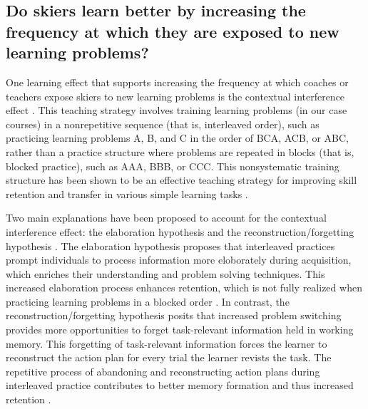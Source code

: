 \subsection{Do skiers learn better by increasing the frequency at which they are exposed to new learning problems?}
One learning effect that supports increasing the frequency at which coaches or teachers expose skiers to new learning problems is the contextual interference effect \cite{lee_contextual_2012, shea_contextual_1979, magill_review_1990}. This teaching strategy involves training learning problems (in our case courses) in a nonrepetitive sequence (that is, interleaved order), such as practicing learning problems A, B, and C in the order of BCA, ACB, or ABC, rather than a practice structure where problems are repeated in blocks (that is, blocked practice), such as AAA, BBB, or CCC. This nonsystematic training structure has been shown to be an effective teaching strategy for improving skill retention and transfer in various simple learning tasks \cite{tsutsui_contextual_1998, simon_metacognition_2001, shea_context_1983, shea_contextual_1979, tsay_signatures_2023}.

Two main explanations have been proposed to account for the contextual interference effect: the elaboration hypothesis \cite{shea_contextual_1979, shea_context_1983} and the reconstruction/forgetting hypothesis \cite{lee_can_1985, lee_locus_1983}. The elaboration hypothesis proposes that interleaved practices prompt individuals to process information more eloborately during acquisition, which enriches their understanding and problem solving techniques. This increased elaboration process enhances retention, which is not fully realized when practicing learning problems in a blocked order \cite{shea_contextual_1979, shea_context_1983}. In contrast, the reconstruction/forgetting hypothesis posits that increased problem switching provides more opportunities to forget task-relevant information held in working memory. This forgetting of task-relevant information forces the learner to reconstruct the action plan for every trial the learner revists the task. The repetitive process of abandoning and reconstructing action plans during interleaved practice contributes to better memory formation and thus increased retention \cite{lee_can_1985, lee_locus_1983}.

